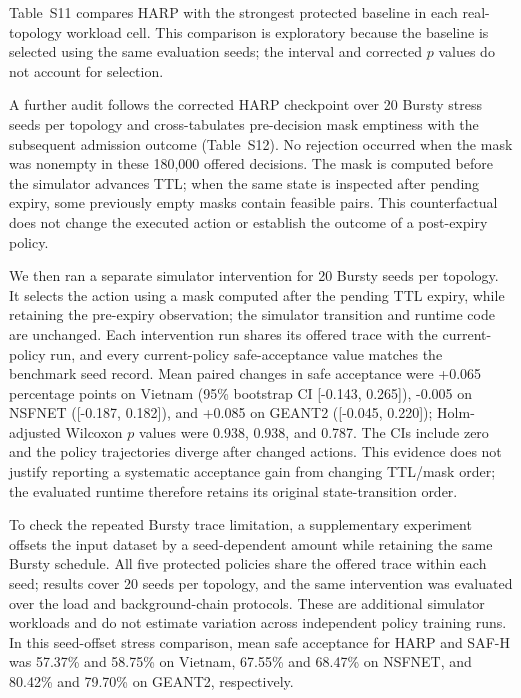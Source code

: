 \documentclass[final,5p]{elsarticle}
\newcommand{\rev}[1]{\textcolor{revisiongreen}{#1}}
\let\newrev\rev
\begin{document}





\newrev{Table~S11 compares HARP with the strongest protected baseline in each real-topology workload cell. This comparison is exploratory because the baseline is selected using the same evaluation seeds; the interval and corrected $p$ values do not account for selection.}

\newrev{A further audit follows the corrected HARP checkpoint over 20 Bursty stress seeds per topology and cross-tabulates pre-decision mask emptiness with the subsequent admission outcome (Table~S12). No rejection occurred when the mask was nonempty in these 180,000 offered decisions. The mask is computed before the simulator advances TTL; when the same state is inspected after pending expiry, some previously empty masks contain feasible pairs. This counterfactual does not change the executed action or establish the outcome of a post-expiry policy.}



\newrev{We then ran a separate simulator intervention for 20 Bursty seeds per topology. It selects the action using a mask computed after the pending TTL expiry, while retaining the pre-expiry observation; the simulator transition and runtime code are unchanged. Each intervention run shares its offered trace with the current-policy run, and every current-policy safe-acceptance value matches the benchmark seed record. Mean paired changes in safe acceptance were +0.065 percentage points on Vietnam (95\% bootstrap CI [-0.143, 0.265]), -0.005 on NSFNET ([-0.187, 0.182]), and +0.085 on GEANT2 ([-0.045, 0.220]); Holm-adjusted Wilcoxon $p$ values were 0.938, 0.938, and 0.787. The CIs include zero and the policy trajectories diverge after changed actions. This evidence does not justify reporting a systematic acceptance gain from changing TTL/mask order; the evaluated runtime therefore retains its original state-transition order.}

\newrev{To check the repeated Bursty trace limitation, a supplementary experiment offsets the input dataset by a seed-dependent amount while retaining the same Bursty schedule. All five protected policies share the offered trace within each seed; results cover 20 seeds per topology, and the same intervention was evaluated over the load and background-chain protocols. These are additional simulator workloads and do not estimate variation across independent policy training runs. In this seed-offset stress comparison, mean safe acceptance for HARP and SAF-H was 57.37\% and 58.75\% on Vietnam, 67.55\% and 68.47\% on NSFNET, and 80.42\% and 79.70\% on GEANT2, respectively.}
\end{document}
